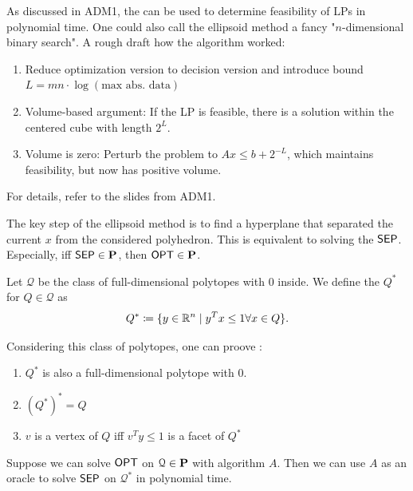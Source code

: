 \begin{recall}
    As discussed in ADM1, the  can be used to determine feasibility of LPs in polynomial time.
    One could also call the ellipsoid method a fancy "$n$-dimensional binary search".
    A rough draft how the algorithm worked:
    \begin{enumerate}
        \item Reduce optimization version to decision version and introduce bound $L = mn \cdot \log(\text{max abs. data})$
        \item Volume-based argument: If the LP is feasible, there is a solution within the centered cube with length $2^L$.
        \item Volume is zero: Perturb the problem to $Ax \leq b + 2^{-L}$, which maintains feasibility, but now has positive volume.
    \end{enumerate}
    For details, refer to the slides from ADM1.
\end{recall}
\begin{remark}
    The key step of the ellipsoid method is to find a hyperplane that separated the current $x$ from the considered polyhedron.
    This is equivalent to solving the  $\mathsf{SEP}$.
    Especially, iff $\mathsf{SEP} \in \mathbf{P}$, then $\mathsf{OPT} \in \mathbf{P}$.
\end{remark}
\begin{definition}
    Let $\mathcal{Q}$ be the class of full-dimensional polytopes with $0$ inside.
    We define the  $Q^*$ for $Q \in \mathcal{Q}$ as
    \begin{align*}
        Q^* \coloneqq \{ y \in \mathbb{R}^n \mid y^Tx \leq 1 \forall x \in Q \}.
    \end{align*}
\end{definition}
\begin{theorem}
    Considering this class of polytopes, one can proove \cite[Ch.~4,~Thm.~4.22]{comb-optimization-korte}:
    \begin{enumerate}
        \item $Q^*$ is also a full-dimensional polytope with $0$.
        \item $(Q^*)^* = Q$
        \item $v$ is a vertex of $Q$ iff $v^Ty \leq 1$ is a facet of $Q^*$
    \end{enumerate}
\end{theorem}
\begin{theorem}
    Suppose we can solve $\mathsf{OPT}$ on $\mathcal{Q} \in \pP$ with algorithm $A$.
    Then we can use $A$ as an oracle to solve $\mathsf{SEP}$ on $\mathcal{Q}^*$ in polynomial time.
    \label{thm:sep-opt-lp}
\end{theorem}
